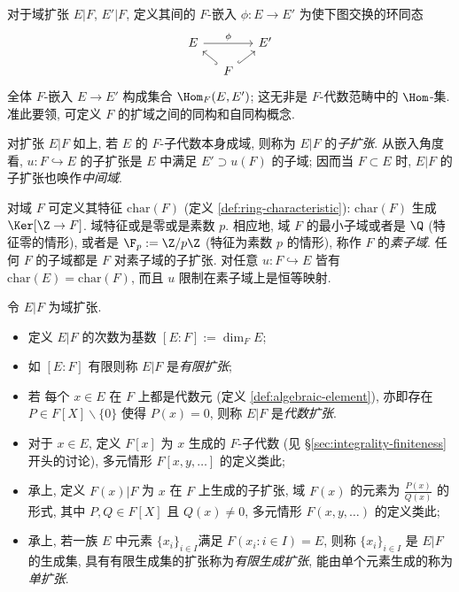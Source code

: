\begin{convention}
	对于域扩张 $E|F$, $E'|F$, 定义其间的 $F$-嵌入 $\phi: E \to E'$ 为使下图交换的环同态
	\[\begin{tikzcd}[column sep=small, row sep=small]
		E \arrow[rr, "\phi"] & & E' \\
		& F \arrow[hookrightarrow, lu] \arrow[hookrightarrow, ru] &
	\end{tikzcd}\]
	全体 $F$-嵌入 $E \to E'$ 构成集合 $\Hom_F(E, E')$; 这无非是 $F$-代数范畴中的 $\Hom$-集. 准此要领, 可定义 $F$ 的扩域之间的同构和自同构概念.
\end{convention}
对扩张 $E|F$ 如上, 若 $E$ 的 $F$-子代数本身成域, 则称为 $E|F$ 的\emph{子扩张}. 从嵌入角度看, $u: F \hookrightarrow E$ 的子扩张是 $E$ 中满足 $E' \supset u(F)$ 的子域; 因而当 $F \subset E$ 时, $E|F$ 的子扩张也唤作\emph{中间域}.

对域 $F$ 可定义其特征 $\text{char}(F)$ (定义 \ref{def:ring-characteristic}): $\text{char}(F)$ 生成 $\Ker[\Z \to F]$. 域特征或是零或是素数 $p$. 相应地, 域 $F$ 的最小子域或者是 $\Q$ (特征零的情形), 或者是 $\F_p := \Z/p\Z$ (特征为素数 $p$ 的情形), 称作 $F$ 的\emph{素子域}. 任何 $F$ 的子域都是 $F$ 对素子域的子扩张. 对任意 $u: F \hookrightarrow E$ 皆有 $\text{char}(E)=\text{char}(F)$, 而且 $u$ 限制在素子域上是恒等映射. 

\begin{definition}
	令 $E|F$ 为域扩张.
	\begin{itemize}
		\item 定义 $E|F$ 的次数为基数 $[E:F] := \dim_F E$;\index[sym1]{$[E:F]$}
		\item 如 $[E:F]$ 有限则称 $E|F$ 是\emph{有限扩张};
		\item 若 每个 $x \in E$ 在 $F$ 上都是代数元 (定义 \ref{def:algebraic-element}), 亦即存在 $P \in F[X] \smallsetminus \{0\}$ 使得 $P(x)=0$, 则称 $E|F$ 是\emph{代数扩张}.
		\item 对于 $x \in E$, 定义 $F[x]$ 为 $x$ 生成的 $F$-子代数 (见 \S\ref{sec:integrality-finiteness} 开头的讨论), 多元情形 $F[x,y, \ldots]$ 的定义类此;
		\item 承上, 定义 $F(x)|F$ 为 $x$ 在 $F$ 上生成的子扩张, 域 $F(x)$ 的元素为 $\frac{P(x)}{Q(x)}$ 的形式, 其中 $P,Q \in F[X]$ 且 $Q(x) \neq 0$, 多元情形 $F(x,y,\ldots)$ 的定义类此;
		\item 承上, 若一族 $E$ 中元素 $\{x_i\}_{i \in I}$满足 $F(x_i : i \in I) = E$, 则称 $\{x_i\}_{i \in I}$ 是 $E|F$ 的生成集, 具有有限生成集的扩张称为\emph{有限生成扩张}, 能由单个元素生成的称为\emph{单扩张}.
	\end{itemize}
\end{definition}

